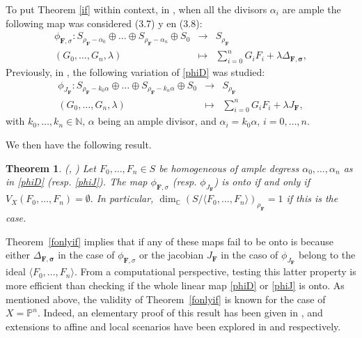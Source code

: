 \documentclass[a4paper,11pt]{amsart}
\newcommand{\C}{\mathbb{C}}
\newcommand{\N}{\mathbb{N}}
\renewcommand{\P}{\mathbb{P}}
\newcommand{\bfsigma}{{\boldsymbol{\sigma}}}
\newcommand{\bfF}{{\boldsymbol{F}}}
\newcounter{thm}
\numberwithin{thm}{section}
\numberwithin{equation}{section}
\theoremstyle{definition}
\theoremstyle{plain}
\newtheorem{theorem}[thm]{Theorem}
\begin{document}
To  put Theorem \ref{if} within context, in \cite{DK05}, when all the divisors $\alpha_i$ are ample the following map was considered (3.7) y en (3.8):
\begin{equation}\label{phiD}
\begin{array}{ccc}
\phi_{\bfF,\sigma}:S_{\rho_\bfF-\alpha_0}\oplus\ldots\oplus S_{\rho_\bfF-\alpha_n}\oplus S_0&\to& S_{\rho_\bfF}\\
(G_0,\ldots, G_n,\lambda)&\mapsto & \sum_{i=0}^n G_i F_i +\lambda\Delta_{\bfF,\bfsigma},
\end{array}
\end{equation}
Previously, in \cite{CDS98}, the following variation of \eqref{phiD} was studied:
\begin{equation}\label{phiJ}
\begin{array}{ccc}
\phi_{J_\bfF}:S_{\rho_\bfF-k_0\alpha}\oplus\ldots\oplus S_{\rho_\bfF-k_n\alpha}\oplus S_0&\to& S_{\rho_\bfF}\\
(G_0,\ldots, G_n,\lambda)&\mapsto & \sum_{i=0}^n G_i F_i +\lambda J_\bfF,
\end{array}
\end{equation}
with $k_0,\ldots, k_n\in\N,\,\alpha$ being an ample divisor, and $\alpha_i=k_0\alpha,\,i=0,\ldots, n.$

We then have the following result.
\begin{theorem}\label{resn0} (\cite[Prop 2.1]{CDS98}, \cite[Prop 4.2]{DK05})
Let $F_0,\ldots, F_n\in S$ be homogeneous of ample degress $\alpha_0,\ldots, \alpha_n$ as in \eqref{phiD} (resp. \eqref{phiJ}). The map $\phi_{\bfF,\sigma}$ (resp. $\phi_{J_\bfF}$) is onto if and only if $V_X(F_0,\ldots, F_n)=\emptyset.$ In particular, $\dim_\C\left(S/\langle F_0,\ldots, F_n\rangle\right)_{\rho_\bfF}=1$ if this is the case.
\end{theorem}

Theorem~\ref{fonlyif} implies that if any of these maps fail to be onto is because either $\Delta_{\bfF,\bfsigma}$ in the case of $\phi_{\bfF,\sigma}$ or the jacobian $J_\bfF$ in the caso of $\phi_{J_\bfF}$ belong to the ideal $\langle F_0,\ldots, F_n\rangle$.  From a computational perspective, testing this latter property is more efficient than checking if the whole linear map \eqref{phiD} or \eqref{phiJ} is onto. 
As mentioned above, the validity  of Theorem~\ref{fonlyif} is known for the case of $X=\P^n$. Indeed, an elementary proof of this result has been given in \cite{spo89}, and extensions to affine and local scenarios have been explored in \cite{BY00} and \cite{hic08} respectively.  
\end{document}
